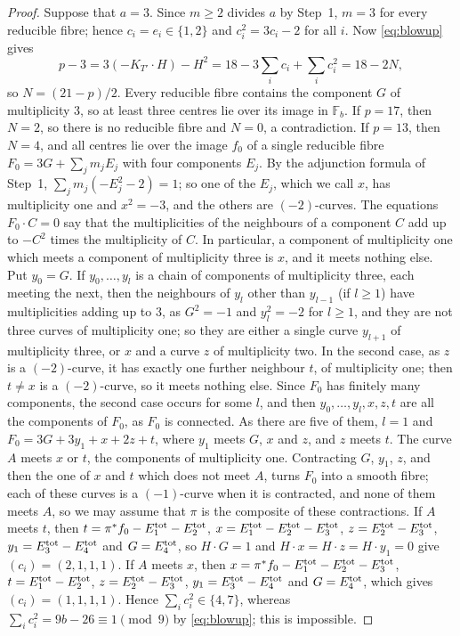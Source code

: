 \begin{proof}
Suppose that $a = 3$.
Since $m\geq 2$ divides $a$ by Step~1, $m = 3$ for every reducible fibre; hence $c_i = e_i\in\{1,2\}$ and $c_i^2 = 3c_i-2$ for all $i$.
Now \eqref{eq:blowup} gives
\[
  p-3 = 3(-K_{T'}\cdot H)-H^2 = 18-3\sum_ic_i+\sum_ic_i^2 = 18-2N,
\]
so $N = (21-p)/2$.
Every reducible fibre contains the component $G$ of multiplicity $3$, so at least three centres lie over its image in $\mathbb F_b$.
If $p = 17$, then $N = 2$, so there is no reducible fibre and $N = 0$, a contradiction.
If $p = 13$, then $N = 4$, and all centres lie over the image $f_0$ of a single reducible fibre $F_0 = 3G+\sum_jm_jE_j$ with four components $E_j$.
By the adjunction formula of Step~1, $\sum_jm_j(-E_j^2-2) = 1$; so one of the $E_j$, which we call $x$, has multiplicity one and $x^2 = -3$, and the others are $(-2)$-curves.
The equations $F_0\cdot C = 0$ say that the multiplicities of the neighbours of a component $C$ add up to $-C^2$ times the multiplicity of $C$.
In particular, a component of multiplicity one which meets a component of multiplicity three is $x$, and it meets nothing else.
Put $y_0 = G$.
If $y_0,\dots,y_l$ is a chain of components of multiplicity three, each meeting the next, then the neighbours of $y_l$ other than $y_{l-1}$ (if $l\geq 1$) have multiplicities adding up to $3$, as $G^2 = -1$ and $y_l^2 = -2$ for $l\geq 1$, and they are not three curves of multiplicity one; so they are either a single curve $y_{l+1}$ of multiplicity three, or $x$ and a curve $z$ of multiplicity two.
In the second case, as $z$ is a $(-2)$-curve, it has exactly one further neighbour $t$, of multiplicity one; then $t\neq x$ is a $(-2)$-curve, so it meets nothing else.
Since $F_0$ has finitely many components, the second case occurs for some $l$, and then $y_0,\dots,y_l,x,z,t$ are all the components of $F_0$, as $F_0$ is connected.
As there are five of them, $l = 1$ and $F_0 = 3G+3y_1+x+2z+t$, where $y_1$ meets $G$, $x$ and $z$, and $z$ meets $t$.
The curve $A$ meets $x$ or $t$, the components of multiplicity one.
Contracting $G$, $y_1$, $z$, and then the one of $x$ and $t$ which does not meet $A$, turns $F_0$ into a smooth fibre; each of these curves is a $(-1)$-curve when it is contracted, and none of them meets $A$, so we may assume that $\pi$ is the composite of these contractions.
If $A$ meets $t$, then $t = \pi^*f_0-E_1^{\rm tot}-E_2^{\rm tot}$, $x = E_1^{\rm tot}-E_2^{\rm tot}-E_3^{\rm tot}$, $z = E_2^{\rm tot}-E_3^{\rm tot}$, $y_1 = E_3^{\rm tot}-E_4^{\rm tot}$ and $G = E_4^{\rm tot}$, so $H\cdot G = 1$ and $H\cdot x = H\cdot z = H\cdot y_1 = 0$ give $(c_i) = (2,1,1,1)$.
If $A$ meets $x$, then $x = \pi^*f_0-E_1^{\rm tot}-E_2^{\rm tot}-E_3^{\rm tot}$, $t = E_1^{\rm tot}-E_2^{\rm tot}$, $z = E_2^{\rm tot}-E_3^{\rm tot}$, $y_1 = E_3^{\rm tot}-E_4^{\rm tot}$ and $G = E_4^{\rm tot}$, which gives $(c_i) = (1,1,1,1)$.
Hence $\sum_ic_i^2\in\{4,7\}$, whereas $\sum_ic_i^2 = 9b-26\equiv 1\pmod 9$ by \eqref{eq:blowup}; this is impossible.


\end{proof}
